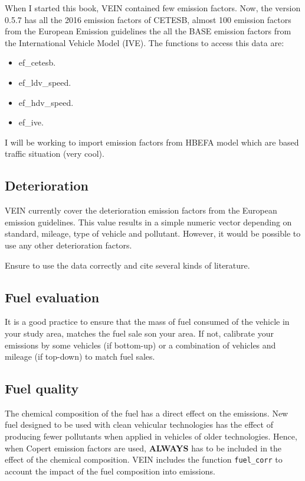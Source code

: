 \documentclass[12pt,graybox,envcountchap,sectrefs]{krantz}
\providecommand{\tightlist}{%
  \setlength{\itemsep}{0pt}\setlength{\parskip}{0pt}}
\theoremstyle{definition}
\theoremstyle{definition}
\theoremstyle{definition}
\theoremstyle{remark}
\begin{document}
When I started this book, VEIN contained few emission factors. Now, the
version 0.5.7 has all the 2016 emission factors of CETESB, almost 100
emission factors from the European Emission guidelines the all the BASE
emission factors from the International Vehicle Model (IVE). The
functions to access this data are:

\begin{itemize}
\tightlist
\item
  ef\_cetesb.
\item
  ef\_ldv\_speed.
\item
  ef\_hdv\_speed.
\item
  ef\_ive.
\end{itemize}

I will be working to import emission factors from HBEFA model which are
based traffic situation (very cool).

\subsection{Deterioration}\label{deterioration}

VEIN currently cover the deterioration emission factors from the
European emission guidelines. This value results in a simple numeric
vector depending on standard, mileage, type of vehicle and pollutant.
However, it would be possible to use any other deterioration factors.

Ensure to use the data correctly and cite several kinds of literature.

\subsection{Fuel evaluation}\label{fuel-evaluation}

It is a good practice to ensure that the mass of fuel consumed of the
vehicle in your study area, matches the fuel sale son your area. If not,
calibrate your emissions by some vehicles (if bottom-up) or a
combination of vehicles and mileage (if top-down) to match fuel sales.

\subsection{Fuel quality}\label{fuel-quality}

The chemical composition of the fuel has a direct effect on the
emissions. New fuel designed to be used with clean vehicular
technologies has the effect of producing fewer pollutants when applied
in vehicles of older technologies. Hence, when Copert emission factors
are used, \textbf{ALWAYS} has to be included in the effect of the
chemical composition. VEIN includes the function \texttt{fuel\_corr} to
account the impact of the fuel composition into emissions.
\end{document}
